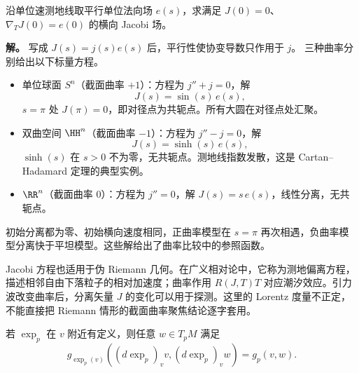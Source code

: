 \begin{exbox}
沿单位速测地线取平行单位法向场 $e(s)$，求满足 $J(0)=0$、$\nabla_TJ(0)=e(0)$ 的横向 Jacobi 场。

\textbf{解。} 写成 $J(s)=j(s)e(s)$ 后，平行性使协变导数只作用于 $j$。
三种曲率分别给出以下标量方程。
\begin{itemize}
\item 单位球面 $S^n$（截面曲率 $+1$）：方程为 $j''+j=0$，解
\begin{equation*}
 J(s)=\sin(s)\,e(s),
\end{equation*}
$s=\pi$ 处 $J(\pi)=0$，即对径点为共轭点。所有大圆在对径点处汇聚。
\item 双曲空间 $\HH^n$（截面曲率 $-1$）：方程为 $j''-j=0$，解
\begin{equation*}
 J(s)=\sinh(s)\,e(s),
\end{equation*}
$\sinh(s)$ 在 $s>0$ 不为零，无共轭点。测地线指数发散，这是 Cartan--Hadamard 定理的典型实例。
\item $\RR^n$（截面曲率 $0$）：方程为 $j''=0$，解 $J(s)=s\,e(s)$，线性分离，无共轭点。
\end{itemize}
初始分离都为零、初始横向速度相同，正曲率模型在 $s=\pi$ 再次相遇，负曲率模型分离快于平坦模型。这些解给出了曲率比较中的参照函数。
\end{exbox}

Jacobi 方程也适用于伪 Riemann 几何。在广义相对论中，它称为测地偏离方程，描述相邻自由下落粒子的相对加速度；曲率作用 $R(J,T)T$ 对应潮汐效应。引力波改变曲率后，分离矢量 $J$ 的变化可以用于探测。这里的 Lorentz 度量不正定，不能直接把 Riemann 情形的截面曲率聚焦结论逐字套用。

\begin{lemma}
若 $\exp_p$ 在 $v$ 附近有定义，则任意 $w\in T_pM$ 满足\[g_{\exp_p(v)}((d\exp_p)_vv,(d\exp_p)_vw)=g_p(v,w).\]
\end{lemma}

